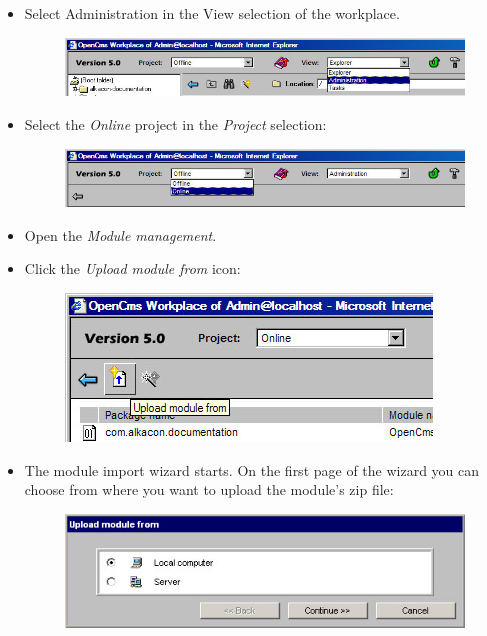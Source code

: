 \begin{itemize}

\item Select Administration in the View selection of the workplace.
\begin{figure}[hbt]
\begin{center}
\includegraphics[width=\sgw]{pics/modules/import0}
\end{center}
\end{figure}

\item Select the {\em Online} project in the {\em Project} selection:
\begin{figure}[hbt]
\begin{center}
\includegraphics[width=\sgw]{pics/modules/import1}
\end{center}
\end{figure}

\item Open the {\em Module management}.

\item Click the {\em Upload module from} icon:
\begin{figure}[hbt]
\begin{center}
\includegraphics[width=\sgw]{pics/modules/import2}
\end{center}
\end{figure}

\item The module import wizard starts. On the first page of the wizard you can choose from where you want 
to upload the module's zip file:
\begin{figure}[hbt]
\begin{center}
\includegraphics[width=\sgw]{pics/modules/import3}
\end{center}
\end{figure}


\end{itemize}
